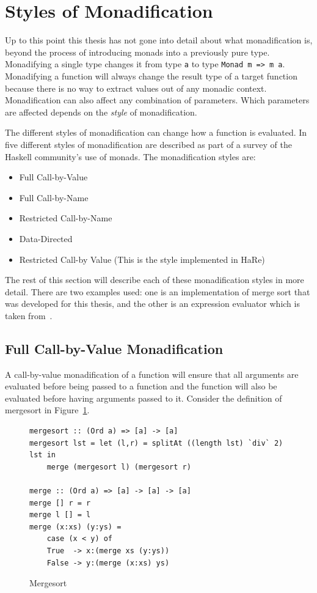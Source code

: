\section{Styles of Monadification}
\label{monadStyles}

Up to this point this thesis has not gone into detail about what monadification is, beyond the process of introducing monads into a previously pure type. Monadifying a single type changes it from type \texttt{a} to type \texttt{Monad m => m a}. Monadifying a function will always change the result type of a target function because there is no way to extract values out of any monadic context. Monadification can also affect any combination of parameters. Which parameters are affected depends on the \textit{style} of monadification.

The different styles of monadification can change how a function is evaluated. In~\cite{monadSurvey} five different styles of monadification are described as part of a survey of the Haskell community's use of monads. The monadification styles are:

\begin{itemize}
\item Full Call-by-Value
\item Full Call-by-Name
\item Restricted Call-by-Name
\item Data-Directed
\item Restricted Call-by Value (This is the style implemented in HaRe)
\end{itemize}

The rest of this section will describe each of these monadification styles in more detail. There are two examples used: one is an implementation of merge sort that was developed for this thesis, and the other is an expression evaluator which is taken from~\cite{monadSurvey}. 

\subsection{Full Call-by-Value Monadification}

A call-by-value monadification of a function will ensure that all arguments are evaluated before being passed to a function and the function will also be evaluated before having arguments passed to it. Consider the definition of mergesort in Figure~\ref{mergesrt}.

\begin{figure}[t]
\begin{lstlisting}
mergesort :: (Ord a) => [a] -> [a]
mergesort lst = let (l,r) = splitAt ((length lst) `div` 2) lst in
	merge (mergesort l) (mergesort r)
	
merge :: (Ord a) => [a] -> [a] -> [a]
merge [] r = r
merge l [] = l
merge (x:xs) (y:ys) = 
	case (x < y) of
	True  -> x:(merge xs (y:ys))
	False -> y:(merge (x:xs) ys)						
\end{lstlisting}
\caption{Mergesort}
\label{mergesrt}
\end{figure}

